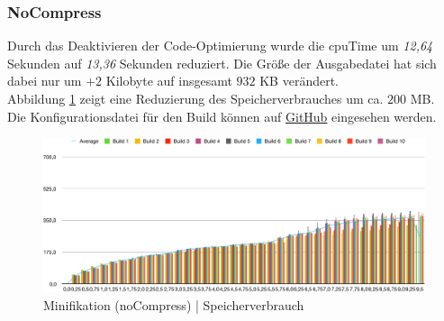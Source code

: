 \documentclass[11pt]{report}
\begin{document}
        		\subsubsection{NoCompress}
        			\label{section:minification_noCompress}
	        		Durch das Deaktivieren der Code-Optimierung wurde die \Gls{cpuTime} um \emph{12,64} Sekunden auf \emph{13,36} Sekunden reduziert. Die Größe der Ausgabedatei hat sich dabei nur um $+2$ Kilobyte auf insgesamt $932$ KB verändert.\\
	        		Abbildung \ref{figure:minification_noCompress_memory} zeigt eine Reduzierung des Speicherverbrauches um ca. $200$ MB.\\
		        	Die Konfigurationsdatei für den Build können auf \href{https://github.com/TexNAK/WebBundlerOptimization/compare/master...nondestr_scopedCompilation#diff-1fb5683b1e7adbcee273b7f9f9a08a22}{GitHub} eingesehen werden.
			        \begin{figure}[p]
			            \includegraphics[width=\textwidth]{img/nondestr_minify_nocompress_memory}
			            \caption{Minifikation (noCompress) | Speicherverbrauch}
			            \label{figure:minification_noCompress_memory}
			        \end{figure}
\end{document}

